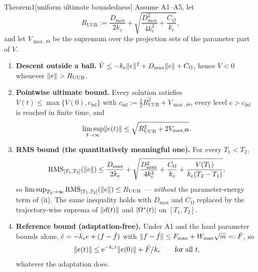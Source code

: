 \begin{thm}{Theorem}{1}[uniform ultimate boundedness]
Assume A1--A5, let
\[
R_{\mathrm{UUB}}:=\frac{D_{\max}}{2k_e}+\sqrt{\frac{D_{\max}^2}{4k_e^2}+\frac{C_\Omega}{k_e}},
\]
and let $V_{\max,\Theta}$ be the supremum over the projection sets of the parameter part of $V$.
\begin{enumerate}[label=(\roman*)]
\item \textbf{Descent outside a ball.} $\dot V\le-k_e\lVert e\rVert^2+D_{\max}\lVert e\rVert+C_\Omega$, hence $\dot V<0$ whenever
  $\lVert e\rVert>R_{\mathrm{UUB}}$.
\item \textbf{Pointwise ultimate bound.} Every solution satisfies $V(t)\le\max\{V(0),c_{\inf}\}$ with
  $c_{\inf}:=\tfrac12R_{\mathrm{UUB}}^2+V_{\max,\Theta}$, every level $c>c_{\inf}$ is reached in finite time, and
  \[
  \limsup_{t\to\infty}\lVert e(t)\rVert\le\sqrt{R_{\mathrm{UUB}}^2+2V_{\max,\Theta}}.
  \]
\item \textbf{RMS bound (the quantitatively meaningful one).} For every $T_1<T_2$,
  \[
  \operatorname{RMS}_{[T_1,T_2]}(\lVert e\rVert)\le\frac{D_{\max}}{2k_e}
  +\sqrt{\frac{D_{\max}^2}{4k_e^2}+\frac{C_\Omega}{k_e}+\frac{V(T_1)}{k_e(T_2-T_1)}},
  \]
  so $\limsup_{T_2\to\infty}\operatorname{RMS}_{[T_1,T_2]}(\lVert e\rVert)\le R_{\mathrm{UUB}}$ --- \emph{without} the parameter-energy
  term of (ii). The same inequality holds with $D_{\max}$ and $C_\Omega$ replaced by the trajectory-wise suprema of
  $\lVert d(t)\rVert$ and $\lvert \Omega^*(t)\rvert$ on $[T_1,T_2]$.
\item \textbf{Reference bound (adaptation-free).} Under A1 and the hard parameter bounds alone,
  $\dot e=-k_e e+(f-\hat f)$ with $\lVert f-\hat f\rVert\le F_{\max}+W_{\max}\sqrt m=:\tilde F$, so
  \[
  \lVert e(t)\rVert\le\mathrm{e}^{-k_e t}\lVert e(0)\rVert+\tilde F/k_e\qquad\text{for all }t,
  \]
  whatever the adaptation does.
\end{enumerate}
\end{thm}

